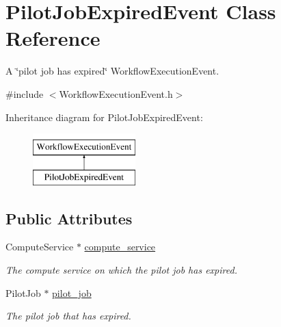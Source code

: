 \hypertarget{class_pilot_job_expired_event}{}\section{Pilot\+Job\+Expired\+Event Class Reference}
\label{class_pilot_job_expired_event}


A \char`\"{}pilot job has expired\char`\"{} Workflow\+Execution\+Event.  




{\ttfamily \#include $<$Workflow\+Execution\+Event.\+h$>$}

Inheritance diagram for Pilot\+Job\+Expired\+Event\+:\begin{figure}[H]
\begin{center}
\leavevmode
\includegraphics[height=2.000000cm]{class_pilot_job_expired_event}
\end{center}
\end{figure}
\subsection*{Public Attributes}
\begin{DoxyCompactItemize}
\item 
\mbox{\label{class_pilot_job_expired_event_ac06a71dada17e7a20a1e25900a53011f}} 
Compute\+Service $\ast$ \hyperlink{class_pilot_job_expired_event_ac06a71dada17e7a20a1e25900a53011f}{compute\+\_\+service}
\begin{DoxyCompactList}\small\item\em The compute service on which the pilot job has expired. \end{DoxyCompactList}\item 
\mbox{\label{class_pilot_job_expired_event_abca05e0908d122107c322c42a2624a04}} 
Pilot\+Job $\ast$ \hyperlink{class_pilot_job_expired_event_abca05e0908d122107c322c42a2624a04}{pilot\+\_\+job}
\begin{DoxyCompactList}\small\item\em The pilot job that has expired. \end{DoxyCompactList}\end{DoxyCompactItemize}


